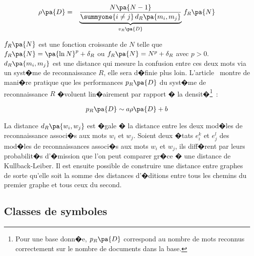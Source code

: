         \begin{eqnarray}
        \rho\pa{D}         &=&    \underset{ v_R\pa{D} } 
                                                {\underbrace{\frac{N\pa{N-1}} { \summyone { i \neq j} \, d_R \pa{m_i,m_j} } } }
                                             \; f_R\pa{N} 
        \end{eqnarray}
        


$f_R\pa{N}$ est une fonction croissante de $N$ telle que $f_R\pa{N} = \pa{\ln N}^p + \delta_R$ ou $f_R\pa{N} = N^p + \delta_R$ avec $p > 0$. $d_R\pa{m_i,m_j}$ est une distance qui mesure la confusion entre ces deux mots via un syst�me de reconnaissance $R$, elle sera d�finie plus loin. L'article~ montre de mani�re pratique que les performances $p_R\pa{D}$ du syst�me de reconnaissance $R$ �voluent lin�airement par rapport � la densit�\footnote{Pour une base donn�e, $p_R\pa{D}$ correspond au nombre de mots reconnus correctement sur le nombre de documents dans la base.}~:


        \begin{eqnarray}
        p_R\pa{D} \sim a \rho\pa{D} + b
        \end{eqnarray}



La distance $d_R\pa{w_i,w_j}$ est �gale � la distance entre les deux mod�les de reconnaissance associ�s aux mots $w_i$ et $w_j$. Soient deux �tats $e_i^k$ et $e_j^l$ des mod�les de reconnaissances associ�s aux mots $w_i$ et $w_j$, ils diff�rent par leurs probabilit�s d'�mission que l'on peut comparer gr�ce � une distance de Kullback-Leiber. Il est ensuite possible de construire une distance entre graphes de sorte qu'elle soit la somme des distances d'�ditions entre tous les chemins du premier graphe et tous ceux du second.










\subsection{Classes de symboles}

